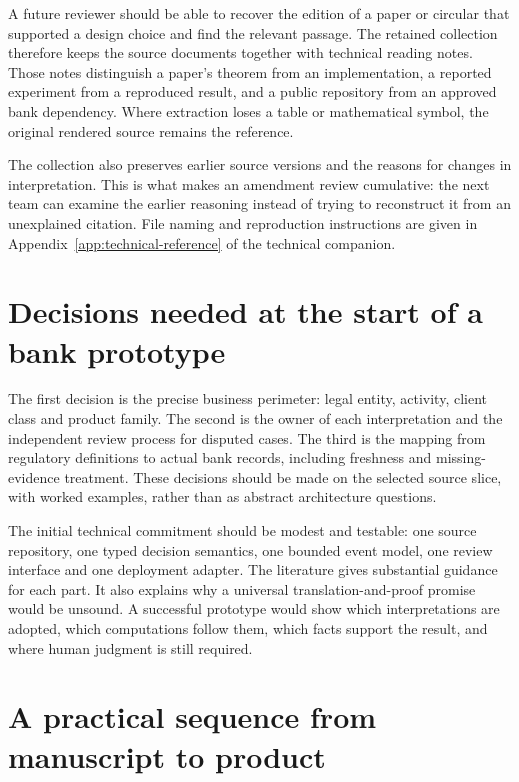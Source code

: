 \documentclass[12pt,a4paper,oneside,openany]{book}
\begin{document}
A future reviewer should be able to recover the edition of a paper or circular
that supported a design choice and find the relevant passage. The retained
collection therefore keeps the source documents together with technical reading
notes. Those notes distinguish a paper's theorem from an implementation, a
reported experiment from a reproduced result, and a public repository from an
approved bank dependency. Where extraction loses a table or mathematical symbol,
the original rendered source remains the reference.

The collection also preserves earlier source versions and the reasons for changes
in interpretation. This is what makes an amendment review cumulative: the next
team can examine the earlier reasoning instead of trying to reconstruct it from
an unexplained citation. File naming and reproduction instructions are given in
Appendix~\ref{app:technical-reference} of the technical companion.


\section{Decisions needed at the start of a bank prototype}
\label{merge:P-05-evidence:03}


The first decision is the precise business perimeter: legal entity, activity,
client class and product family. The second is the owner of each interpretation
and the independent review process for disputed cases. The third is the mapping
from regulatory definitions to actual bank records, including freshness and
missing-evidence treatment. These decisions should be made on the selected source
slice, with worked examples, rather than as abstract architecture questions.

The initial technical commitment should be modest and testable: one source
repository, one typed decision semantics, one bounded event model, one review
interface and one deployment adapter. The literature gives substantial guidance
for each part. It also explains why a universal translation-and-proof promise
would be unsound. A successful prototype would show which interpretations are
adopted, which computations follow them, which facts support the result, and where
human judgment is still required.

\section{A practical sequence from manuscript to product}
\label{merge:M10:14}
\end{document}
